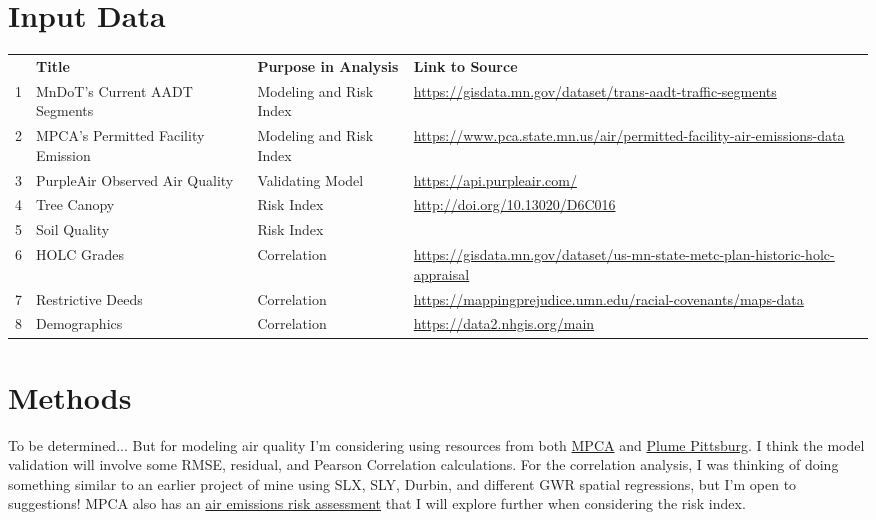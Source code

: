 \documentclass[article,12pt]{article}
\numberwithin{equation}{section}
\begin{document}
\section*{Input Data}
{
	\scriptsize
	\begin{tabular}{|l|p{.2\linewidth}|p{.2\linewidth}|p{.4\linewidth}|}
	& \textbf{Title}                              & \textbf{Purpose in Analysis}     & \textbf{Link to Source}                                                               \\
	1 & MnDoT’s Current AADT Segments \cite{mndot_reg}     & Modeling and Risk Index & \url{https://gisdata.mn.gov/dataset/trans-aadt-traffic-segments}                   \\
	2 & MPCA’s Permitted Facility Emission \cite{mpca_emitter} & Modeling and Risk Index & \url{https://www.pca.state.mn.us/air/permitted-facility-air-emissions-data}        \\
	3 & PurpleAir Observed Air Quality    & Validating Model        & \url{https://api.purpleair.com/}                                                   \\
	4 & Tree Canopy \cite{tree2015}                        & Risk Index              & \url{http://doi.org/10.13020/D6C016}                                               \\
	5 & Soil Quality                       & Risk Index              &                                                                              \\
	6 & HOLC Grades                        & Correlation             & \url{https://gisdata.mn.gov/dataset/us-mn-state-metc-plan-historic-holc-appraisal} \\
	7 & Restrictive Deeds                  & Correlation             & \url{https://mappingprejudice.umn.edu/racial-covenants/maps-data}                \\
	8 & Demographics \cite{ipums}                       & Correlation             & \url{https://data2.nhgis.org/main}                                               
\end{tabular}
}

\section*{Methods}

To be determined... But for modeling air quality I'm considering using resources from both \href{https://www.pca.state.mn.us/business-with-us/air-quality-modeling}{MPCA}  and \href{https://plumepgh.org/model_data.html}{Plume Pittsburg}. I think the model validation will involve some RMSE, residual, and Pearson Correlation calculations. For the correlation analysis, I was thinking of doing something similar to an earlier project of mine using SLX, SLY, Durbin, and different GWR spatial regressions, but I'm open to suggestions! MPCA also has an \href{https://www.pca.state.mn.us/business-with-us/air-emissions-risk-analysis-aera}{air emissions risk assessment} that I will explore further when considering the risk index.
\end{document}
